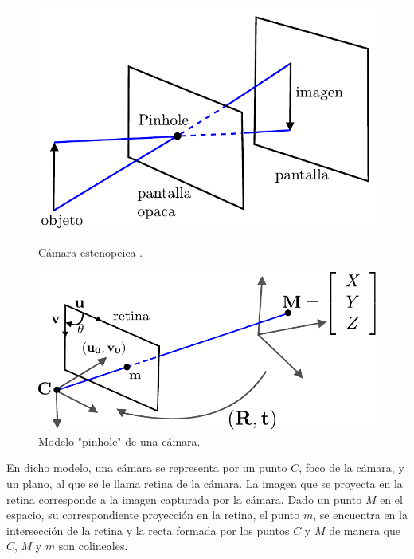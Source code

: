 \begin{figure}[ht!]
\hspace{-0.6cm}
\begin{minipage}[t]{.45\textwidth}
\begin{center}
\includegraphics[scale=0.5]{img/calibracion/pinhole_camara}
\end{center}
\caption{Cámara estenopeica .\cite{faugeras_libro}}
\label{pinhole_camara}
\end{minipage}
\hspace{0.8cm}
\begin{minipage}[t]{.550\textwidth}
\begin{center}
\includegraphics[scale=0.55]{img/calibracion/pinhole_modelo}
\end{center}
\caption{Modelo "pinhole" de una cámara.\cite{zhang_libro}}
\label{pinhole_modelo}
\end{minipage}
\hfill
\end{figure}



En dicho modelo, una cámara se representa por un punto $C$, foco de la cámara, y un plano, al  que se le llama retina de la cámara. La imagen que se proyecta en la retina corresponde a la imagen capturada por la cámara. Dado un punto $M$ en el espacio, su correspondiente proyección en la retina, el punto $m$, se encuentra en la intersección de la retina y la recta formada por los puntos $C$ y $M$ de manera que $C$, $M$ y $m$ son colineales.\\ 

